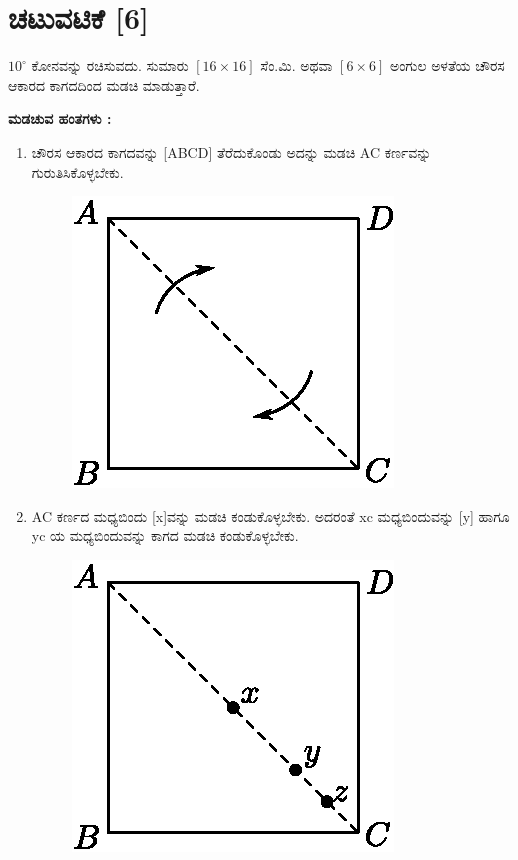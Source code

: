 \section*{ಚಟುವಟಿಕೆ [6]}
$10^\circ$ ಕೋನವನ್ನು ರಚಿಸುವದು. ಸುಮಾರು $[16 \times 16]$ ಸೆಂ.ಮಿ. ಅಥವಾ  $[6 \times 6]$ ಅಂಗುಲ ಅಳತೆಯ ಚೌರಸ ಆಕಾರದ ಕಾಗದದಿಂದ ಮಡಚಿ ಮಾಡುತ್ತಾರೆ. 

\medskip
\noindent
\textbf{ಮಡಚುವ ಹಂತಗಳು :}
\begin{enumerate}
\item ಚೌರಸ ಆಕಾರದ ಕಾಗದವನ್ನು [ABCD] ತೆರೆದುಕೊಂಡು ಅದನ್ನು ಮಡಚಿ AC ಕರ್ಣವನ್ನು ಗುರುತಿಸಿಕೊಳ್ಳಬೇಕು. 
\begin{figure}[H]
\centering
\includegraphics[scale=.98]{src/figure/chap1/fig1-12a.eps}
\end{figure}

\item AC ಕರ್ಣದ ಮಧ್ಯಬಿಂದು [x]ವನ್ನು ಮಡಚಿ ಕಂಡುಕೊಳ್ಳಬೇಕು. ಅದರಂತೆ  xc ಮಧ್ಯಬಿಂದುವನ್ನು  [y] ಹಾಗೂ  yc ಯ ಮಧ್ಯಬಿಂದುವನ್ನು ಕಾಗದ ಮಡಚಿ ಕಂಡುಕೊಳ್ಳಬೇಕು. 
\begin{figure}[H]
\centering
\includegraphics[scale=.98]{src/figure/chap1/fig1-12b.eps}
\end{figure}


\end{enumerate}
